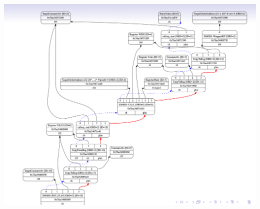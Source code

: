 \documentclass[a4paper]{exam}
\theoremstyle{definition}
\begin{document}
\begin{center}
  \includegraphics[height=12cm]{img/Snipaste_2021-04-05_17-45-22.png}
\end{center}

\printbibliography
\end{document}
